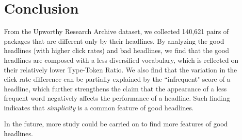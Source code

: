 \documentclass[%
preprint,
 amsmath,amssymb,
 aps,
]{revtex4-2}
\begin{document}
\section{Conclusion}

From the Upworthy Research Archive dataset, we collected 140,621 pairs of packages that are different only by their headlines.
By analyzing the good headlines (with higher click rates) and bad headlines, we find that the good headlines are composed with a less diversified vocabulary, which is reflected on their relatively lower Type-Token Ratio.
We also find that the variation in the click rate difference can be partially explained by the ``infrequent" score of a headline, which further strengthens the claim that the appearance of a less frequent word negatively affects the performance of a headline.
Such finding indicates that \textit{simplicity} is a common feature of good headlines.

In the future, more study could be carried on to find more features of good headlines.

\end{document}
